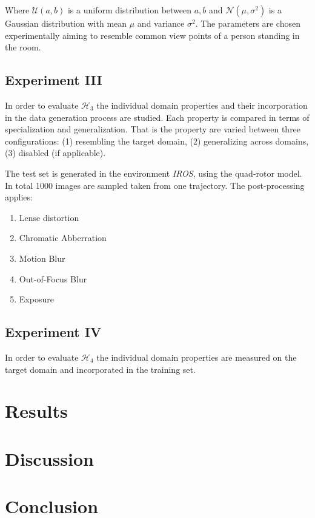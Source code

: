 Where $ \mathcal{U}(a,b)$ is a uniform distribution between $a,b$ and $\mathcal{N}(\mu,\sigma^2)$ is a Gaussian distribution with mean $\mu$ and variance $\sigma^2$.
The parameters are chosen experimentally aiming to resemble common view points of a person standing in the room.

\subsection{Experiment III}

In order to evaluate $\mathcal{H}_3$ the individual domain properties and their incorporation in the data generation process are studied. Each property is compared in terms of specialization and generalization. That is the property are varied between three configurations: (1) resembling the target domain, (2) generalizing across domains, (3) disabled (if applicable).

The test set is generated in the environment \textit{IROS}, using the quad-rotor model. In total 1000 images are sampled taken from one trajectory. The post-processing applies:
\begin{enumerate}
	\item Lense distortion
	\item Chromatic Abberration
	\item Motion Blur
	\item Out-of-Focus Blur
	\item Exposure
\end{enumerate}

\subsection{Experiment IV}

In order to evaluate $\mathcal{H}_4$ the individual domain properties are measured on the target domain and incorporated in the training set.


\section{Results}
\label{sec:training:results}

\section{Discussion}
\label{sec:training:discussion}

\section{Conclusion}
\label{sec:training:conclusion}


